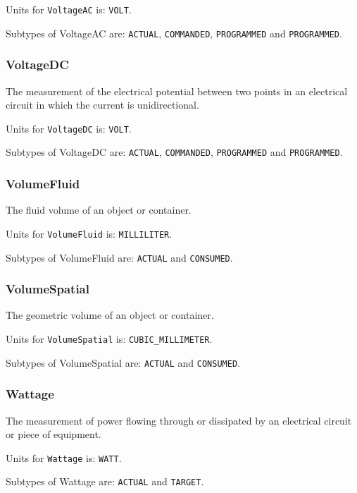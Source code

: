 Units for \texttt{VoltageAC} is: \texttt{VOLT}.


Subtypes of VoltageAC are: \texttt{ACTUAL}, \texttt{COMMANDED}, \texttt{PROGRAMMED} and \texttt{PROGRAMMED}. 
\FloatBarrier

\subsubsection{VoltageDC}
  \label{sec:VoltageDC}


The measurement of the electrical potential between two points in an electrical circuit in which the current is unidirectional.


Units for \texttt{VoltageDC} is: \texttt{VOLT}.


Subtypes of VoltageDC are: \texttt{ACTUAL}, \texttt{COMMANDED}, \texttt{PROGRAMMED} and \texttt{PROGRAMMED}. 
\FloatBarrier

\subsubsection{VolumeFluid}
  \label{sec:VolumeFluid}


The fluid volume of an object or container.


Units for \texttt{VolumeFluid} is: \texttt{MILLILITER}.


Subtypes of VolumeFluid are: \texttt{ACTUAL} and \texttt{CONSUMED}. 
\FloatBarrier

\subsubsection{VolumeSpatial}
  \label{sec:VolumeSpatial}


The geometric volume of an object or container.


Units for \texttt{VolumeSpatial} is: \texttt{CUBIC_MILLIMETER}.


Subtypes of VolumeSpatial are: \texttt{ACTUAL} and \texttt{CONSUMED}. 
\FloatBarrier

\subsubsection{Wattage}
  \label{sec:Wattage}


The measurement of power flowing through or dissipated by an electrical circuit or piece of equipment.


Units for \texttt{Wattage} is: \texttt{WATT}.


Subtypes of Wattage are: \texttt{ACTUAL} and \texttt{TARGET}. 
\FloatBarrier

